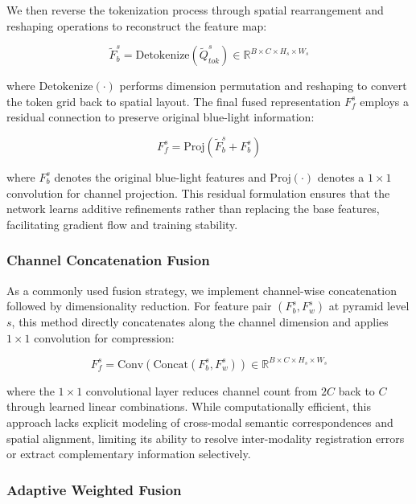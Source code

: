 We then reverse the tokenization process through spatial rearrangement and reshaping operations to reconstruct the feature map:

\begin{equation}
\widetilde{F}_b^s = \text{Detokenize}(\widetilde{Q}^s_{tok}) \in \mathbb{R}^{B \times C \times H_s \times W_s}
\end{equation}

where $\text{Detokenize}(\cdot)$ performs dimension permutation and reshaping to convert the token grid back to spatial layout. The final fused representation $F_{f}^s$ employs a residual connection to preserve original blue-light information:

\begin{equation}
F_{f}^s = \text{Proj}(\widetilde{F}_b^s + F_b^s)
\end{equation}

where $F_b^s$ denotes the original blue-light features and $\text{Proj}(\cdot)$ denotes a $1 \times 1$ convolution for channel projection. This residual formulation ensures that the network learns additive refinements rather than replacing the base features, facilitating gradient flow and training stability.

\subsubsection{Channel Concatenation Fusion}

As a commonly used fusion strategy, we implement channel-wise concatenation followed by dimensionality reduction. For feature pair $(F_b^s, F_w^s)$ at pyramid level $s$, this method directly concatenates along the channel dimension and applies $1 \times 1$ convolution for compression:

\begin{equation}
F_{f}^s = \text{Conv}(\text{Concat}(F_b^s, F_w^s)) \in \mathbb{R}^{B \times C \times H_s \times W_s}
\end{equation}

where the $1 \times 1$ convolutional layer reduces channel count from $2C$ back to $C$ through learned linear combinations. While computationally efficient, this approach lacks explicit modeling of cross-modal semantic correspondences and spatial alignment, limiting its ability to resolve inter-modality registration errors or extract complementary information selectively.

\subsubsection{Adaptive Weighted Fusion}

